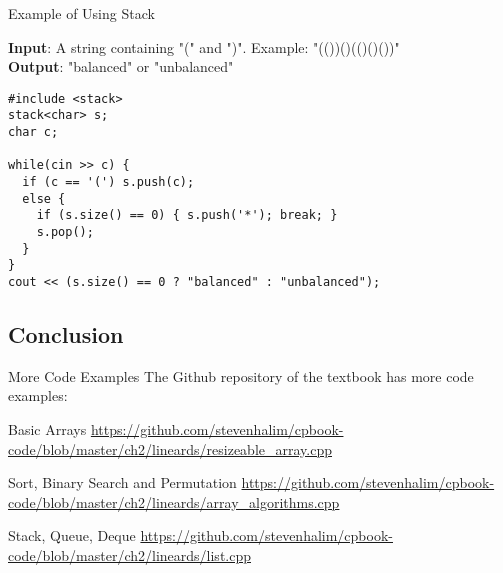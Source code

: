 \begin{frame}[fragile]{Example of Using Stack}

  {\bf Input}: A string containing "(" and ")". Example: "(())()(()()())"\\
  {\bf Output}: "balanced" or "unbalanced"

{\small
\begin{verbatim}
#include <stack>
stack<char> s;
char c;

while(cin >> c) {
  if (c == '(') s.push(c);
  else {
    if (s.size() == 0) { s.push('*'); break; }
    s.pop();
  }
}
cout << (s.size() == 0 ? "balanced" : "unbalanced");
\end{verbatim}}
\end{frame}

\subsection{Conclusion}

\begin{frame}{More Code Examples}
  The Github repository of the textbook has more code examples:

  \begin{block}{Basic Arrays}
    \url{https://github.com/stevenhalim/cpbook-code/blob/master/ch2/lineards/resizeable_array.cpp}
  \end{block}

  \begin{block}{Sort, Binary Search and Permutation}
    \url{https://github.com/stevenhalim/cpbook-code/blob/master/ch2/lineards/array_algorithms.cpp}
  \end{block}

  \begin{block}{Stack, Queue, Deque}
    \url{https://github.com/stevenhalim/cpbook-code/blob/master/ch2/lineards/list.cpp}
  \end{block}

\end{frame}
